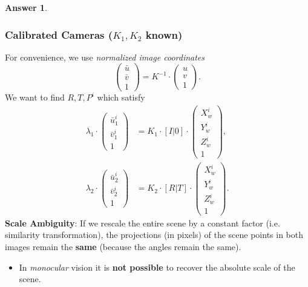 \documentclass[a4paper,12 pt]{article}
\theoremstyle{definition}
\theoremstyle{remark}
\theoremstyle{definition}
\theoremstyle{definition}
\theoremstyle{definition}
\theoremstyle{definition}
\theoremstyle{remark}
\theoremstyle{remark}
\theoremstyle{definition}
\theoremstyle{definition}
\newtheorem*{answer}{Answer}
\begin{document}
\begin{enumerate}
\begin{answer}
\subsubsection*{Calibrated Cameras ($K_1,K_2$ known)}
For convenience, we use \textit{normalized image coordinates}
\begin{equation}
\begin{pmatrix}
\bar{u}\\
\bar{v}\\
1
\end{pmatrix}=K^{-1}\cdot \begin{pmatrix}
u\\
v\\
1
\end{pmatrix}.
\end{equation}
We want to find $R,T,P^i$ which satisfy
\begin{equation}
\begin{split}
\lambda_1 \cdot \begin{pmatrix}
 \bar{u}_1^i\\
 \bar{v}_1^i\\
 1
 \end{pmatrix}&=K_1\cdot [I|0]\cdot \begin{pmatrix}
 X_w^i\\
 Y_w^i\\
 Z_w^i\\
 1
 \end{pmatrix},\\
 \lambda_2 \cdot \begin{pmatrix}
 \bar{u}_2^i\\
 \bar{v}_2^i\\
 1
 \end{pmatrix}&=K_2\cdot [R|T]\cdot \begin{pmatrix}
 X_w^i\\
 Y_w^i\\
 Z_w^i\\
 1
 \end{pmatrix}.
\end{split}
\end{equation}
\textbf{Scale Ambiguity}: If we rescale the entire scene by a constant factor (i.e. similarity transformation), the projections (in pixels) of the scene points in both images remain the \textbf{same} (because the angles remain the same).
\begin{itemize}
\item In \textit{monocular} vision it is \textbf{not possible} to recover the absolute scale of the scene.

\end{itemize}
\end{answer}
\end{enumerate}
\end{document}

